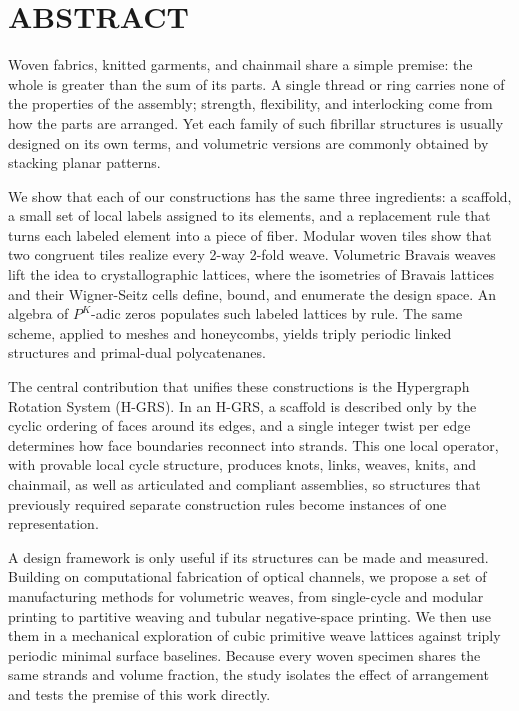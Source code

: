 %
%
%
%

\chapter*{ABSTRACT}

\pagestyle{plain} %
\setcounter{page}{2}

Woven fabrics, knitted garments, and chainmail share a simple premise: the whole is greater than the sum of its parts. A single thread or ring carries none of the properties of the assembly; strength, flexibility, and interlocking come from how the parts are arranged. Yet each family of such fibrillar structures is usually designed on its own terms, and volumetric versions are commonly obtained by stacking planar patterns.

We show that each of our constructions has the same three ingredients: a scaffold, a small set of local labels assigned to its elements, and a replacement rule that turns each labeled element into a piece of fiber. Modular woven tiles show that two congruent tiles realize every 2-way 2-fold weave. Volumetric Bravais weaves lift the idea to crystallographic lattices, where the isometries of Bravais lattices and their Wigner-Seitz cells define, bound, and enumerate the design space. An algebra of $P^K$-adic zeros populates such labeled lattices by rule. The same scheme, applied to meshes and honeycombs, yields triply periodic linked structures and primal-dual polycatenanes.

The central contribution that unifies these constructions is the Hypergraph Rotation System (H-GRS). In an H-GRS, a scaffold is described only by the cyclic ordering of faces around its edges, and a single integer twist per edge determines how face boundaries reconnect into strands. This one local operator, with provable local cycle structure, produces knots, links, weaves, knits, and chainmail, as well as articulated and compliant assemblies, so structures that previously required separate construction rules become instances of one representation.

A design framework is only useful if its structures can be made and measured. Building on computational fabrication of optical channels, we propose a set of manufacturing methods for volumetric weaves, from single-cycle and modular printing to partitive weaving and tubular negative-space printing. We then use them in a mechanical exploration of cubic primitive weave lattices against triply periodic minimal surface baselines. Because every woven specimen shares the same strands and volume fraction, the study isolates the effect of arrangement and tests the premise of this work directly.

\pagebreak{}
